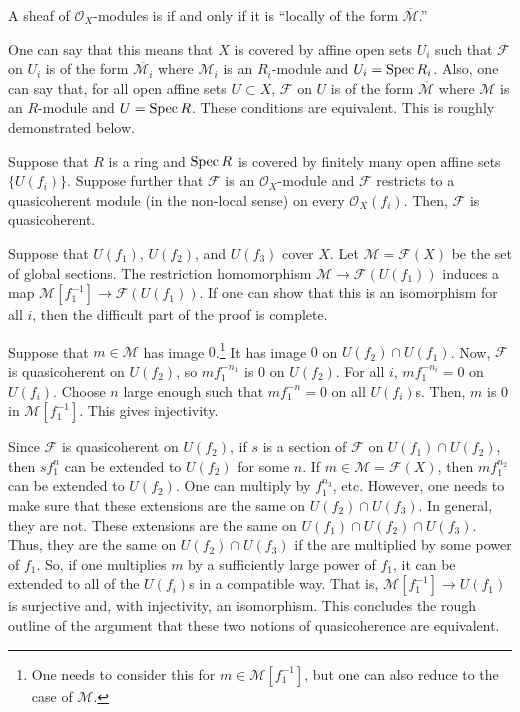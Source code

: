 \documentclass [11 pt, oneside] {article}
\begin{document}
\begin{definition}[ ]\label{}\text{}
A sheaf of $\mathscr{O}_X$-modules is  if and only if it is ``locally of the form $\overline{\mathscr{M}}$.''
\end{definition}

One can say that this means that $X$ is covered by affine open sets $U_i$ such that $\mathscr{F}$ on $U_i$ is of the form $\overline{\mathscr{M}_i}$ where $\mathscr{M}_i$ is an $R_i$-module and $U_i=\operatorname{Spec} R_i$. Also, one can say that, for all open affine sets $U\subset X$, $\mathscr{F}$ on $U$ is of the form $\overline{\mathscr{M}}$ where $\mathscr{M}$ is an $R$-module and $U=\operatorname{Spec} R$. These conditions are equivalent. This is roughly demonstrated below.

Suppose that $R$ is a ring and $\operatorname{Spec} R$ is covered by finitely many open affine sets $\{U(f_i)\}$. Suppose further that $\mathscr{F}$ is an $\mathscr{O}_X$-module and $\mathscr{F}$ restricts to a quasicoherent module (in the non-local sense) on every $\mathscr{O}_X(f_i)$. Then, $\mathscr{F}$ is quasicoherent.

Suppose that $U(f_1)$, $U(f_2)$, and $U(f_3)$ cover $X$. Let $\mathscr{M}=\mathscr{F}(X)$ be the set of global sections. The restriction homomorphism $\mathscr{M}\longrightarrow \mathscr{F}(U(f_1))$ induces a map $\mathscr{M}[f_1^{-1}] \longrightarrow \mathscr{F}(U(f_1))$. If one can show that this is an isomorphism for all $i$, then the difficult part of the proof is complete.

Suppose that $m\in \mathscr{M}$ has image $0$.\footnote{One needs to consider this for $m\in \mathscr{M}[f_1^{-1}]$, but one can also reduce to the case of $\mathscr{M}$.} It has image $0$ on $U(f_2)\cap U(f_1)$. Now, $\mathscr{F}$ is quasicoherent on $U(f_2)$, so $mf_1^{-n_1}$ is $0$ on $U(f_2)$. For all $i$, $mf_1^{-n_i}=0$ on $U (f_i)$. Choose $n$ large enough such that $mf_1^{-n}=0$ on all $U(f_i)$s. Then, $m$ is $0$ in $\mathscr{M}[f_1^{-1}]$. This gives injectivity.

Since $\mathscr{F}$ is quasicoherent on $U(f_2)$, if $s$ is a section of $\mathscr{F}$ on $U(f_1) \cap U(f_2)$, then $sf_1^n$ can be extended to $U(f_2)$ for some $n$. If $m\in \mathscr{M}=\mathscr{F}(X)$, then $mf_1^{n_2}$ can be extended to $U(f_2)$. One can multiply by $f_1^{n_3}$, etc. However, one needs to make sure that these extensions are the same on $U(f_2)\cap U(f_3)$. In general, they are not. These extensions are the same on $U(f_1) \cap U(f_2) \cap U(f_3)$. Thus, they are the same on $U(f_2)\cap U(f_3)$ if the are multiplied by some power of $f_1$. So, if one multiplies $m$ by a sufficiently large power of $f_1$, it can be extended to all of the $U(f_i)$s in a compatible way. That is, $\mathscr{M}[f_1^{-1}]\longrightarrow U(f_1)$ is surjective and, with injectivity, an isomorphism. This concludes the rough outline of the argument that these two notions of quasicoherence are equivalent.
\end{document}
